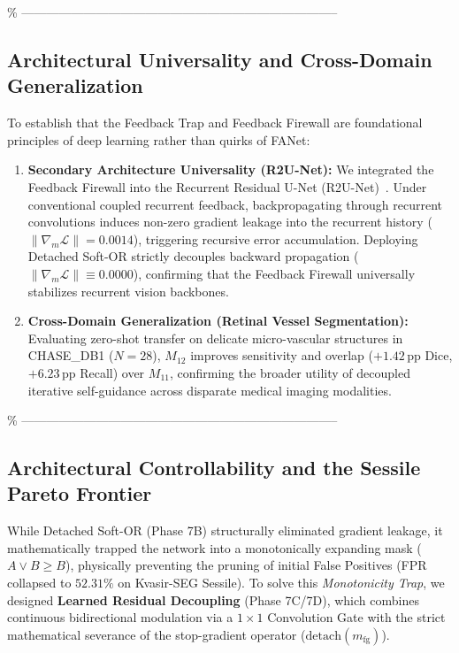 \% -----------------------------------------------------------------------------
\subsection{Architectural Universality and Cross-Domain Generalization}
To establish that the Feedback Trap and Feedback Firewall are foundational
principles of deep learning rather than quirks of FANet:
\begin{enumerate}
  \item \textbf{Secondary Architecture Universality (R2U-Net):}
        We integrated the Feedback Firewall into the Recurrent Residual U-Net
        (R2U-Net)~\cite{alom2018recurrent}. Under conventional coupled recurrent
        feedback, backpropagating through recurrent convolutions induces non-zero
        gradient leakage into the recurrent history ($\|\nabla_m \mathcal{L}\| = 0.0014$),
        triggering recursive error accumulation. Deploying Detached Soft-OR strictly
        decouples backward propagation ($\|\nabla_m \mathcal{L}\| \equiv 0.0000$),
        confirming that the Feedback Firewall universally stabilizes recurrent
        vision backbones.
  \item \textbf{Cross-Domain Generalization (Retinal Vessel Segmentation):}
        Evaluating zero-shot transfer on delicate micro-vascular structures in
        CHASE\_DB1 ($N = 28$), $M_{12}$ improves sensitivity and overlap ($+1.42$\,pp
        Dice, $+6.23$\,pp Recall) over $M_{11}$, confirming the broader utility of
        decoupled iterative self-guidance across disparate medical imaging modalities.
\end{enumerate}

\% -----------------------------------------------------------------------------
\subsection{Architectural Controllability and the Sessile Pareto Frontier}
While Detached Soft-OR (Phase 7B) structurally eliminated gradient leakage, it mathematically trapped the network into a monotonically expanding mask ($A \lor B \ge B$), physically preventing the pruning of initial False Positives (FPR collapsed to $52.31\%$ on Kvasir-SEG Sessile). To solve this \textit{Monotonicity Trap}, we designed \textbf{Learned Residual Decoupling} (Phase 7C/7D), which combines continuous bidirectional modulation via a $1\times1$ Convolution Gate with the strict mathematical severance of the stop-gradient operator ($\text{detach}(m_{\text{fg}})$).

